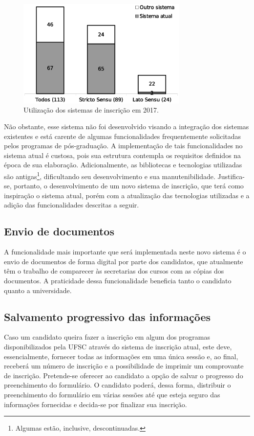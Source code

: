 \documentclass[
  10.5pt,				  %
	openright,			%
	twoside,			  %
  a5paper,
  chapter=TITLE,	%
	section=TITLE,	%
  hyphens,        %
	english,        %
	brazil          %
]{abntex2}
\begin{document}
\begin{figure}[!ht]
  \caption{\label{fig:uso_sistemas}Utilização dos sistemas de inscrição em 2017.}
  \begin{center}
    \includegraphics[width=0.75\textwidth]{uso_sistema_atual}
  \end{center}
\end{figure}

Não obstante, esse sistema não foi desenvolvido visando a integração dos sistemas existentes e está carente de algumas funcionalidades frequentemente solicitadas pelos programas de pós-graduação. A implementação de tais funcionalidades no sistema atual é custosa, pois sua estrutura contempla os requisitos definidos na época de sua elaboração. Adicionalmente, as bibliotecas e tecnologias utilizadas são antigas\footnote{Algumas estão, inclusive, descontinuadas.}, dificultando seu desenvolvimento e sua manutenibilidade. Justifica-se, portanto, o desenvolvimento de um novo sistema de inscrição, que terá como inspiração o sistema atual, porém com a atualização das tecnologias utilizadas e a adição das funcionalidades descritas a seguir.

\subsection{Envio de documentos}
A funcionalidade mais importante que será implementada neste novo sistema é o envio de documentos de forma digital por parte dos candidatos, que atualmente têm o trabalho de comparecer às secretarias dos cursos com as cópias dos documentos. A praticidade dessa funcionalidade beneficia tanto o candidato quanto a universidade.

\subsection{Salvamento progressivo das informações}
Caso um candidato queira fazer a inscrição em algum dos programas disponibilizados pela UFSC através do sistema de inscrição atual, este deve, essencialmente, fornecer todas as informações em uma única sessão e, ao final, receberá um número de inscrição e a possibilidade de imprimir um comprovante de inscrição. Pretende-se oferecer ao candidato a opção de salvar o progresso do preenchimento do formulário. O candidato poderá, dessa forma, distribuir o preenchimento do formulário em várias sessões até que esteja seguro das informações fornecidas e decida-se por finalizar sua inscrição.
\end{document}
